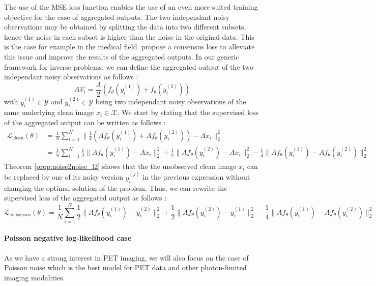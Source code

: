 The use of the MSE loss function enables the use of an even more suited training objective for the case of aggregated outputs.
The two independant noisy observations may be obtained by splitting the data into two
different subsets, hence the noise in each subset is higher than the noise in the original data.
This is the case for example in the medical field.
\cite{wu19} propose a consensus loss to alleviate this issue and improve the results of the aggregated outputs. In our generic framework for inverse problems, we can define the aggregated output of the two independant noisy observations as follows :
\begin{equation}
    A\hat{x_i} = \frac{A}{2}(f_\theta(y_i^{(1)}) + f_\theta(y_i^{(2)}))
\end{equation}
with $y_i^{(1)} \in \mathcal{Y}$ and $y_i^{(2)} \in \mathcal{Y}$ being two independant noisy observations of the same underlying clean image $x_i \in \mathcal{X}$.
We start by stating that the supervised loss of the aggregated output can be written as follows :
\begin{align*}
    \mathcal{L}_{\text{clean}}(\theta) &= \frac{1}{N} \sum_{i=1}^N \| \frac{1}{2}(Af_\theta(y_i^{(1)}) + Af_\theta(y_i^{(2)})) -  Ax_i \|_2^2 \\
    &= \frac{1}{N} \sum_{i=1}^N \frac{1}{2} \| Af_{\theta}(y_i^{(1)}) - Ax_i \|_2^2 + \frac{1}{2} \| Af_{\theta}(y_i^{(2)}) - Ax_i \|_2^2 - \frac{1}{4} \| Af_{\theta}(y_i^{(1)}) - Af_{\theta}(y_i^{(2)}) \|_2^2
\end{align*}
Theorem \ref{prop:noise2noise_l2} shows that the the unobserved clean image $x_i$ can be replaced by one of its noisy version $y_i^{(j)}$ in the previous expression without changing the optimal solution of the problem.
Thus, we can rewrite the supervised loss of the aggregated output as follows :
\begin{equation}
    \mathcal{L}_{\text{consensus}}(\theta) = \frac{1}{N} \sum_{i=1}^N \frac{1}{2} \| Af_{\theta}(y_i^{(1)}) - y_i^{(2)} \|_2^2 + \frac{1}{2} \| Af_{\theta}(y_i^{(2)}) - y_i^{(1)} \|_2^2 - \frac{1}{4} \| Af_{\theta}(y_i^{(1)}) - Af_{\theta}(y_i^{(2)}) \|_2^2
    \label{eq:consensus_loss}
\end{equation}
\paragraph{Poisson negative log-likelihood case}
\label{sec:noise2noise_poisson}

As we have a strong interest in PET imaging, we will also focus on the case of Poisson noise which is the best model for PET data and other photon-limited imaging modalities.

